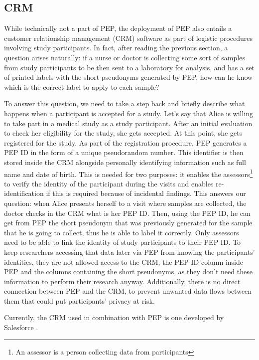 \documentclass{report}
\begin{document}
\subsection{CRM}\label{CRM}
While technically not a part of PEP, the deployment of PEP also entails a customer relationship management (CRM) software as part of logistic procedures involving study participants. In 
fact, after reading the previous section, a question arises naturally: if a nurse or doctor is collecting some sort of samples from study participants to be then sent to a laboratory 
for analysis, and has a set of printed labels with the short pseudonyms generated by PEP, how can he know which is the correct label to apply to each sample? \par
To answer this question, we need to take a step back and briefly describe what happens when a participant is accepted for a study. Let's say that Alice is willing to take part in a
medical study as a study participant. After an initial evaluation to check her eligibility for the study, she gets accepted. At this point, she gets registered for the study. As
part of the registration procedure, PEP generates a PEP ID in the form of a unique pseudorandom number. This identifier is then stored inside the CRM alongside personally
identifying information such as full name and date of birth. This is needed for two purposes: it enables the assessors\footnote{An assessor is a person collecting data from
participants} to verify the identity of the participant during the visits and enables re-identification if this is required because of incidental findings. This answers our
question: when Alice presents herself to a visit where samples are collected, the doctor checks in the CRM what is her PEP ID. Then, using the PEP ID, he can get from PEP the short
pseudonym that was previously generated for the sample that he is going to collect, thus he is able to label it correctly. Only assessors need to be able to link the identity of
study participants to their PEP ID. To keep researchers accessing that data later via PEP from knowing the participants' identities, they are not allowed access to the CRM, the
PEP ID column inside PEP and the columns containing the short pseudonyms, as they don't need these information to perform their research anyway. Additionally, there is no direct
connection between PEP and the CRM, to prevent unwanted data flows between them that could put participants' privacy at risk.\par
Currently, the CRM used in combination with PEP is one developed by Salesforce \cite{salesforce-website}.
\end{document}
